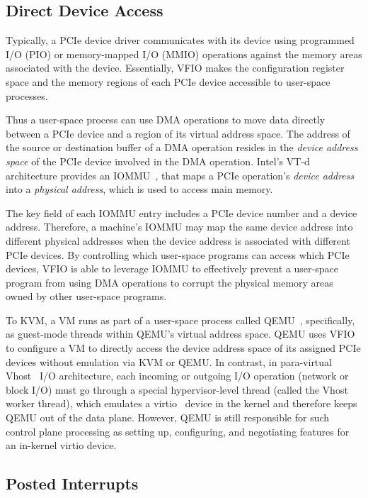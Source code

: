 \subsection{Direct Device Access}
Typically, a PCIe device driver communicates with its device using programmed I/O (PIO) or
memory-mapped I/O (MMIO) operations against the memory areas associated with the device.
Essentially, VFIO makes the configuration register space and the memory regions of
each PCIe device accessible to user-space processes.


Thus a user-space process can use DMA operations to move data directly between a PCIe device and
a region of its virtual address space.
The address of the source or destination buffer of a DMA operation resides in
the {\em device address space} of the PCIe device involved in the DMA operation.
Intel's VT-d architecture provides an IOMMU~\cite{ben:2006}, that maps a
PCIe operation's {\em device address} into a {\em physical address},
which is used to access main memory.

The key field of each IOMMU entry includes a PCIe device number and a device address.
Therefore, a machine's IOMMU may map the same device address into different physical addresses when the device address is associated with different PCIe devices.
By controlling which user-space programs can access which PCIe devices, VFIO is able to leverage IOMMU to effectively prevent a user-space program
from using DMA operations to corrupt the physical memory areas owned by other user-space programs.

To KVM, a VM runs as part of a user-space process  called QEMU~\cite{qemu},
specifically, as guest-mode threads within QEMU's virtual address space.
QEMU uses VFIO to configure a VM to directly access the device address space of
its assigned PCIe devices without emulation via KVM or QEMU.
In contrast, in para-virtual Vhost~\cite{vhost-net} I/O architecture,
each incoming or outgoing I/O operation (network or block I/O) must go through
a special hypervisor-level thread (called the Vhost worker thread),
which emulates a virtio~\cite{russell:2008} device in the kernel and
therefore keeps QEMU out of the data plane.
However, QEMU is still responsible for such control plane processing as setting up,
configuring, and negotiating features for an in-kernel virtio device.


\subsection{Posted Interrupts}

